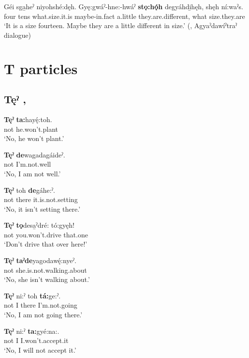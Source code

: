 \ea
\label{ex:spart84}
\gll Géi sga̱heˀ niyohshé:dęh. Gyę:gwáˀ-hne:-hwáˀ \textbf{stǫ:hǫ́h} degyáhdi̱hęh, shęh ní:waˀs.\\
four tens what.size.it.is maybe-in.fact a.little they.are.different, what size.they.are\\
\glt ‘It is a size fourteen. Maybe they are a little different in size.’ (\cite[225]{mithun_watewayestanih_1984}, Agyaˀdawíˀtraˀ dialogue)
\z


\section{T particles}

\subsection*{\textbf{Tęˀ} , } \label{p:[tęˀ]}

\ea
\label{ex:tpart1}
\gll \textbf{Tęˀ} \textbf{ta:}hayę́:toh.\\
not he.won’t.plant\\
\glt ‘No, he won’t plant.’
\z

\ea
\label{ex:tpart2}
\gll \textbf{Tęˀ} \textbf{de}wagadagáideˀ.\\
not I’m.not.well\\
\glt ‘No, I am not well.’
\z

\ea
\label{ex:tpart3}
\gll \textbf{Tęˀ} toh \textbf{de}gáhe:ˀ.\\
not there it.is.not.setting\\
\glt ‘No, it isn’t setting there.’
\z

\ea
\label{ex:tpart4}
\gll \textbf{Tęˀ} \textbf{tǫ}desa̱ˀdré: tó:gyęh!\\
not you.won’t.drive that.one\\
\glt ‘Don’t drive that over here!’
\z

\ea
\label{ex:tpart5}
\gll \textbf{Tęˀ} \textbf{taˀde}yagodawę́:nyeˀ.\\
not she.is.not.walking.about\\
\glt ‘No, she isn’t walking about.’
\z

\ea
\label{ex:tpart6}
\gll \textbf{Tęˀ} ni:ˀ toh \textbf{tá:}ge:ˀ.\\
not I there I’m.not.going\\
\glt ‘No, I am not going there.’
\z

\ea
\label{ex:tpart7}
\gll \textbf{Tęˀ} ni:ˀ \textbf{ta:}gyé:na:.\\
not I I.won’t.accept.it\\
\glt ‘No, I will not accept it.’
\z

